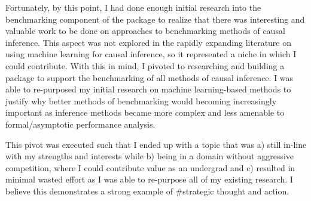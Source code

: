 \documentclass[./main.tex]{subfiles}
\begin{document}
\vspace{\baselineskip}

Fortunately, by this point, I had done enough initial research into the benchmarking component of the package to realize that there was interesting and valuable work to be done on approaches to benchmarking methods of causal inference. This aspect was not explored in the rapidly expanding literature on using machine learning for causal inference, so it represented a niche in which I could contribute. With this in mind, I pivoted to researching and building a package to support the benchmarking of all methods of causal inference. I was able to re-purposed my initial research on machine learning-based methods to justify why better methods of benchmarking would becoming increasingly important as inference methods became more complex and less amenable to formal/asymptotic performance analysis.

\vspace{\baselineskip}

This pivot was executed such that I ended up with a topic that was a) still in-line with my strengths and interests while b) being in a domain without aggressive competition, where I could contribute value as an undergrad and c) resulted in minimal wasted effort as I was able to re-purpose all of my existing research. I believe this demonstrates a strong example of \#strategic thought and action.






\end{document}
